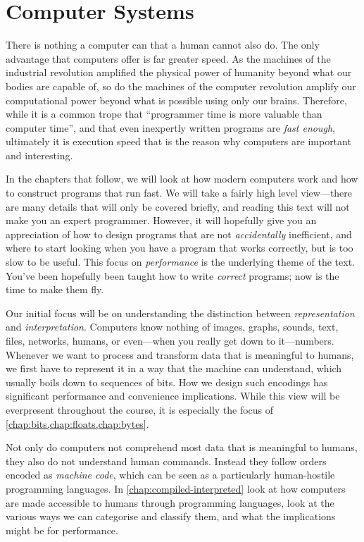 \chapter{Computer Systems}
\label{chap:computers}

There is nothing a computer can that a human cannot also do.  The only
advantage that computers offer is far greater speed.  As the machines
of the industrial revolution amplified the physical power of humanity
beyond what our bodies are capable of, so do the machines of the
computer revolution amplify our computational power beyond what is
possible using only our brains.  Therefore, while it is a common trope
that ``programmer time is more valuable than computer time'', and that
even inexpertly written programs are \emph{fast enough}, ultimately it
is execution speed that is the reason why computers are important and
interesting.

In the chapters that follow, we will look at how modern computers work
and how to construct programs that run fast.  We will take a fairly
high level view---there are many details that will only be covered
briefly, and reading this text will not make you an expert programmer.
However, it will hopefully give you an appreciation of how to design
programs that are not \emph{accidentally} inefficient, and where to
start looking when you have a program that works correctly, but is too
slow to be useful.  This focus on \emph{performance} is the underlying
theme of the text.  You've been hopefully been taught how to write
\emph{correct} programs; now is the time to make them fly.

Our initial focus will be on understanding the distinction between
\emph{representation} and \emph{interpretation}.  Computers know
nothing of images, graphs, sounds, text, files, networks, humans, or
even---when you really get down to it---numbers.  Whenever we want to
process and transform data that is meaningful to humans, we
first have to represent it in a way that the machine can understand,
which usually boils down to sequences of bits.  How we design such
encodings has significant performance and convenience implications.
While this view will be everpresent throughout the course, it is
especially the focus of \cref{chap:bits,chap:floats,chap:bytes}.

Not only do computers not comprehend most data that is meaningful to
humans, they also do not understand human commands.  Instead they
follow orders encoded as \emph{machine code}, which can be seen as a
particularly human-hostile programming languages.  In
\cref{chap:compiled-interpreted} look at how computers are made
accessible to humans through programming languages, look at the
various ways we can categorise and classify them, and what the
implications might be for performance.

